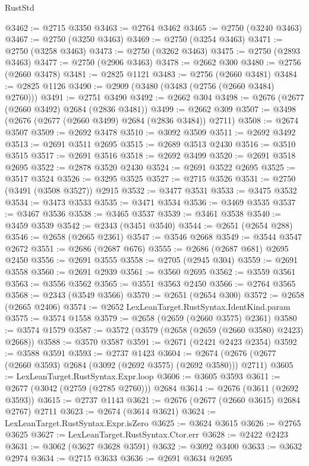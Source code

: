 \begin{lexlean}{RustStd}
\begin{coremodule}
@3462 := @2715 @3350
@3463 := @2764 @3462
@3465 := @2750 (@3240 @3463)
@3467 := @2750 (@3250 @3463)
@3469 := @2750 (@3254 @3463)
@3471 := @2750 (@3258 @3463)
@3473 := @2750 (@3262 @3463)
@3475 := @2750 (@2893 @3463)
@3477 := @2750 (@2906 @3463)
@3478 := @2662 @300
@3480 := @2756 (@2660 @3478)
@3481 := @2825 @1121
@3483 := @2756 (@2660 @3481)
@3484 := @2825 @1126
@3490 := @2909 (@3480 (@3483 (@2756 (@2660 @3484) @2760)))
@3491 := @2751 @3490
@3492 := @2662 @304
@3498 := @2676 (@2677 (@2660 @3492) @2684 (@2836 @3481))
@3499 := @2662 @309
@3507 := @3498 (@2676 (@2677 (@2660 @3499) @2684 (@2836 @3484)) @2711)
@3508 := @2674 @3507
@3509 := @2692 @3478
@3510 := @3092 @3509
@3511 := @2692 @3492
@3513 := @2691 @3511 @2695
@3515 := @2689 @3513 @2430
@3516 := @3510 @3515
@3517 := @2691 @3516
@3518 := @2692 @3499
@3520 := @2691 @3518 @2695
@3522 := @2878 @3520 @2430
@3524 := @2691 @3522 @2695
@3525 := @3517 @3524
@3526 := @3295 @3525
@3527 := @2715 @3526
@3531 := @2750 (@3491 (@3508 @3527)) @2915
@3532 := @3477 @3531
@3533 := @3475 @3532
@3534 := @3473 @3533
@3535 := @3471 @3534
@3536 := @3469 @3535
@3537 := @3467 @3536
@3538 := @3465 @3537
@3539 := @3461 @3538
@3540 := @3459 @3539
@3542 := @2343 (@3451 @3540)
@3544 := @2651 (@2654 @288)
@3546 := @2658 (@2665 @2361)
@3547 := @3546 @2668
@3549 := @3544 @3547 @2672
@3551 := @2686 (@2687 @676)
@3555 := @2686 (@2687 @681) @2695 @2450
@3556 := @2691 @3555
@3558 := @2705 (@2945 @304)
@3559 := @2691 @3558
@3560 := @2691 @2939
@3561 := @3560 @2695
@3562 := @3559 @3561
@3563 := @3556 @3562
@3565 := @3551 @3563 @2450
@3566 := @2764 @3565
@3568 := @2343 (@3549 @3566)
@3570 := @2651 (@2654 @300)
@3572 := @2658 (@2665 @2406)
@3574 := @2652 LexLeanTarget.RustSyntax.IdentKind.param
@3575 := @3574 @1558
@3579 := @2658 (@2659 (@2660 @3575) @2361)
@3580 := @3574 @1579
@3587 := @3572 (@3579 (@2658 (@2659 (@2660 @3580) @2423) @2668))
@3588 := @3570 @3587
@3591 := @2671 (@2421 @2423 @2354)
@3592 := @3588 @3591
@3593 := @2737 @1423
@3604 := @2674 (@2676 (@2677 (@2660 @3593) @2684 (@3092 (@2692 @3575) (@2692 @3580))) @2711)
@3605 := LexLeanTarget.RustSyntax.Expr.loop
@3606 := @3605 @3593
@3611 := @2677 (@3042 (@2759 (@2785 @2760))) @2684
@3614 := @2676 (@3611 (@2692 @3593))
@3615 := @2737 @1143
@3621 := @2676 (@2677 (@2660 @3615) @2684 @2767) @2711
@3623 := @2674 (@3614 @3621)
@3624 := LexLeanTarget.RustSyntax.Expr.isZero
@3625 := @3624 @3615
@3626 := @2765 @3625
@3627 := LexLeanTarget.RustSyntax.Ctor.err
@3628 := @2422 @2423
@3631 := @3062 (@3627 @3628 @3591)
@3632 := @3092 @3400
@3633 := @3632 @2974
@3634 := @2715 @3633
@3636 := @2691 @3634 @2695

\end{coremodule}
\end{lexlean}
